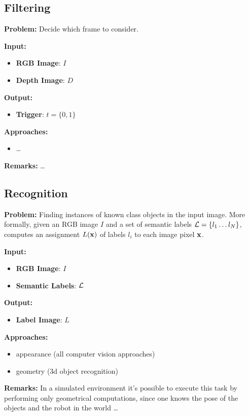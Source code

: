 \documentclass{article}
\begin{document}
	\subsection{Filtering}
	
	{\bf Problem: } Decide which frame to consider.

	\noindent
	{\bf Input: }
	\begin{itemize}
		\item {\bf RGB Image}: $I$
		\item {\bf Depth Image}: $D$
	\end{itemize}
	\noindent
	{\bf Output: }
	\begin{itemize}
		\item {\bf Trigger}: $t = \{0,1\}$
	\end{itemize}
	\noindent
	{\bf Approaches: }
	\begin{itemize}
		\item \dots
	\end{itemize}
	\noindent
	{\bf Remarks: } \dots
	
	\subsection{Recognition}			
	 
	{\bf Problem: } Finding instances of known class objects in the input image. More formally, given an RGB image $I$ and a set of semantic labels $\mathcal{L} = \{ l_1 \dots l_N \}$, computes an assignment $L(\mathbf{x})$ of labels $l_i$ to each image pixel $\mathbf{x}$.
	
	\noindent
	{\bf Input: }
	\begin{itemize}
		\item {\bf RGB Image}: $I$
		\item {\bf Semantic Labels}: $\mathcal{L}$
	\end{itemize}
	\noindent
	{\bf Output: }
	\begin{itemize}
		\item {\bf Label Image}: $L$
	\end{itemize}
	\noindent
	{\bf Approaches: }
	\begin{itemize}
		\item appearance (all computer vision approaches)
		\item geometry (3d object recognition)
	\end{itemize}
	\noindent
	{\bf Remarks: } In a simulated environment it's possible to execute this task by performing only geometrical computations, since one knows the pose of the objects and the robot in the world \dots
	
\end{document}
